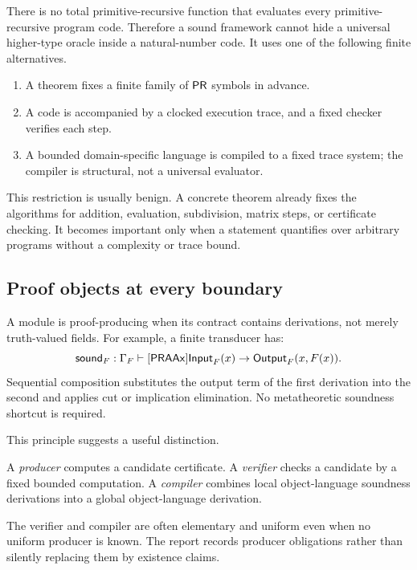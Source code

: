 There is no total primitive-recursive function that evaluates every
primitive-recursive program code.  Therefore a sound framework cannot hide a
universal higher-type oracle inside a natural-number code.  It uses one of the
following finite alternatives.

\begin{enumerate}[label=(\alph*)]
\item A theorem fixes a finite family of \(\mathsf{PR}\) symbols in advance.
\item A code is accompanied by a clocked execution trace, and a fixed checker
      verifies each step.
\item A bounded domain-specific language is compiled to a fixed trace system;
      the compiler is structural, not a universal evaluator.
\end{enumerate}

This restriction is usually benign.  A concrete theorem already fixes the
algorithms for addition, evaluation, subdivision, matrix steps, or certificate
checking.  It becomes important only when a statement quantifies over arbitrary
programs without a complexity or trace bound.

\subsection{Proof objects at every boundary}

A module is proof-producing when its contract contains derivations, not merely
truth-valued fields.  For example, a finite transducer has:
\[
  \mathsf{sound}_F:
  \Gamma_F\vdash[\mathsf{PRAAx}]
  \mathsf{Input}_F(x)\to
  \mathsf{Output}_F(x,F(x)).
\]
Sequential composition substitutes the output term of the first derivation
into the second and applies cut or implication elimination.  No metatheoretic
soundness shortcut is required.

This principle suggests a useful distinction.

\begin{definition}
A \emph{producer} computes a candidate certificate.  A \emph{verifier} checks a
candidate by a fixed bounded computation.  A \emph{compiler} combines local
object-language soundness derivations into a global object-language derivation.
\end{definition}

The verifier and compiler are often elementary and uniform even when no
uniform producer is known.  The report records producer obligations rather than
silently replacing them by existence claims.

